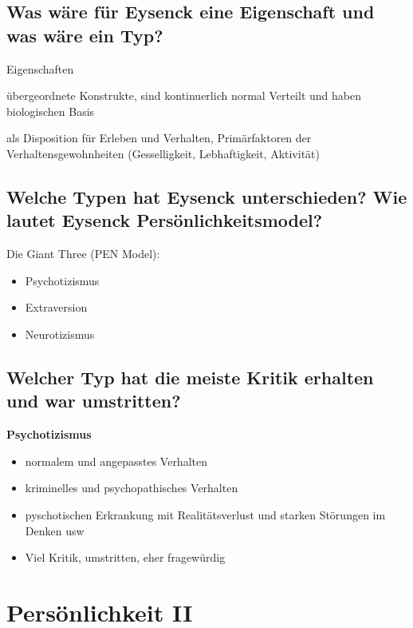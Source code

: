 \documentclass[a6paper,9pt,DIV=14]{scrartcl}
\begin{document}
\subsection{Was wäre für Eysenck eine Eigenschaft und was wäre ein Typ?}
    \begin{labeling}{Eigenschaften}
        \item [Typen] übergeordnete Konstrukte, sind kontinuerlich normal Verteilt und haben biologischen Basis
        \item [Eigenschaften] als Disposition für Erleben und Verhalten, Primärfaktoren der Verhaltensgewohnheiten (Gesselligkeit, Lebhaftigkeit, Aktivität)
    \end{labeling}
\subsection{Welche Typen hat Eysenck unterschieden? Wie lautet Eysenck Persönlichkeitsmodel?} %
    Die Giant Three (PEN Model):\\
    \begin{itemize}
    \item Psychotizismus
    \item Extraversion
    \item Neurotizismus
    \end{itemize}
\subsection{Welcher Typ hat die meiste Kritik erhalten und war umstritten?} %
    \textbf{Psychotizismus}\\
    \begin{itemize}
    \item normalem und angepasstes Verhalten
    \item kriminelles und psychopathisches Verhalten
    \item pyschotischen Erkrankung mit Realitätsverlust und starken Störungen im Denken usw
    \item Viel Kritik, umstritten, eher fragewürdig
    \end{itemize}

\section{Persönlichkeit II}
\end{document}
